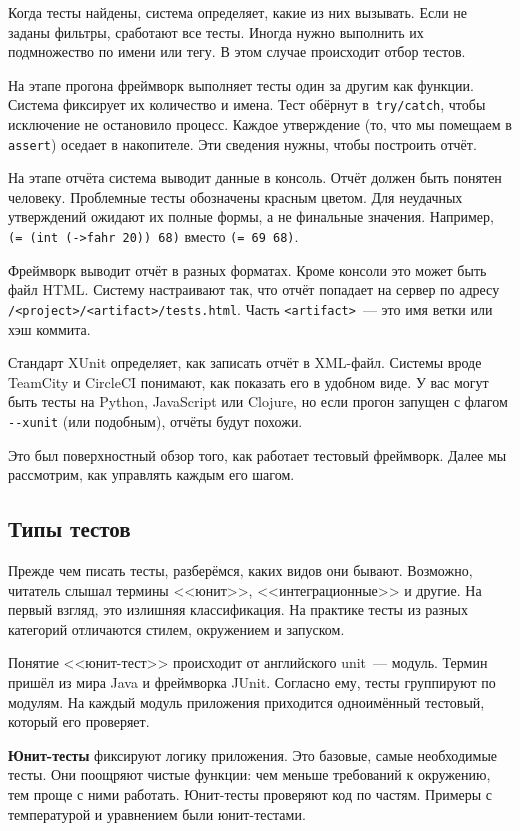 Когда тесты найдены, система определяет, какие из них вызывать. Если не заданы
фильтры, сработают все тесты. Иногда нужно выполнить их подмножество по имени
или тегу. В этом случае происходит отбор тестов.

На этапе прогона фреймворк выполняет тесты один за другим как функции. Система
фиксирует их количество и имена. Тест обёрнут в~\verb|try/catch|, чтобы
исключение не остановило процесс. Каждое утверждение (то, что мы помещаем в
\verb|assert|) оседает в накопителе. Эти сведения нужны, чтобы построить отчёт.

На этапе отчёта система выводит данные в консоль. Отчёт должен быть понятен
человеку. Проблемные тесты обозначены красным цветом. Для неудачных утверждений
ожидают их полные формы, а не финальные значения. Например,
\verb|(= (int (->fahr 20)) 68)| вместо \verb|(= 69 68)|.

Фреймворк выводит отчёт в разных форматах. Кроме консоли это может быть файл
HTML. Систему настраивают так, что отчёт попадает на сервер по адресу
\texttt{/<project>/<arti\-fact>/tests.html}. Часть \verb|<artifact>|~--- это имя
ветки или хэш коммита.

Стандарт XUnit определяет, как записать отчёт в XML-файл. Системы вроде TeamCity
и CircleCI понимают, как показать его в удобном виде. У вас могут быть тесты на
Python, JavaScript или Clojure, но если прогон запущен с флагом \verb|--xunit|
(или подобным), отчёты будут похожи.

Это был поверхностный обзор того, как работает тестовый фреймворк. Далее мы
рассмотрим, как управлять каждым его шагом.

\subsection{Типы тестов}


Прежде чем писать тесты, разберёмся, каких видов они бывают. Возможно, читатель
слышал термины <<юнит>>, <<интеграционные>> и другие. На первый взгляд, это
излишняя классификация. На практике тесты из разных категорий отличаются стилем,
окружением и запуском.

Понятие <<юнит-тест>> происходит от английского unit~--- модуль. Термин пришёл
из мира Java и фреймворка JUnit. Согласно ему, тесты группируют по модулям. На
каждый модуль приложения приходится одноимённый тестовый, который его проверяет.

\textbf{Юнит-тесты} фиксируют логику приложения. Это базовые, самые необходимые
тесты. Они поощряют чистые функции: чем меньше требований к окружению, тем проще
с ними работать. Юнит-тесты проверяют код по частям. Примеры с температурой и
уравнением были юнит-тестами.

